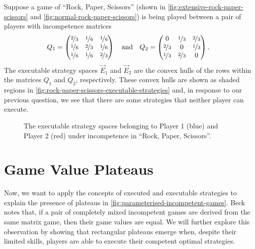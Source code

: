     Suppose a game of ``Rock, Paper, Scissors'' (shown in \autoref{fig:extensive-rock-paper-scissors} and \autoref{fig:normal-rock-paper-scissors}) is being played between a pair of players with incompetence matrices
    \[
        Q_1
            =
            \begin{pmatrix}
                \nicefrac{2}{3} & \nicefrac{1}{6} & \nicefrac{1}{6} \\
                \nicefrac{1}{6} & \nicefrac{2}{3} & \nicefrac{1}{6} \\
                \nicefrac{1}{6} & \nicefrac{1}{6} & \nicefrac{2}{3} \\
            \end{pmatrix}
        \quad\text{and}\quad
        Q_2
            =
            \begin{pmatrix}
                0 & \nicefrac{1}{3} & \nicefrac{2}{3} \\
                \nicefrac{2}{3} & 0 & \nicefrac{1}{3} \\
                \nicefrac{1}{3} & \nicefrac{2}{3} & 0 \\
            \end{pmatrix}.
    \]
    The executable strategy spaces $\vec{E}_1$ and $\vec{E}_2$ are the convex hulls of the rows within the matrices $Q_1$ and $Q_2$, respectively.
    These convex hulls are shown as shaded regions in \autoref{fig:rock-paper-scissors-executable-strategies} and, in response to our previous question, we see that there are some strategies that neither player can execute.

    \begin{figure}[t]
        \centering
        
        \caption[Executable Strategies in Incompetent ``Rock, Paper, Scissors'']{The executable strategy spaces belonging to Player 1 (blue) and Player 2 (red) under incompetence in ``Rock, Paper, Scissors''.}
        \label{fig:rock-paper-scissors-executable-strategies}
    \end{figure}



\section{Game Value Plateaus}  \label{sec:explaining-plateaus}
    Now, we want to apply the concepts of executed and executable strategies to explain the presence of plateaus in \autoref{fig:parameterised-incompetent-games}.
    Beck \parencite[Theorem 3.3]{Beck2013} notes that, if a pair of completely mixed incompetent games are derived from the same matrix game, then their game values are equal.
    We will further explore this observation by showing that rectangular plateaus emerge when, despite their limited skills, players are able to execute their competent optimal strategies.

